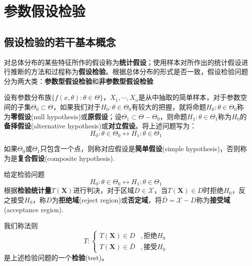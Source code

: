 \documentclass{ctexbook}
\begin{document}
\chapter{参数假设检验}

\section{假设检验的若干基本概念}

\begin{definition}[统计假设和假设检验]
    对总体分布的某些特征所作的假设称为\textbf{统计假设}；使用样本对所作出的统计假设进行推断的方法和过程称为\textbf{假设检验}。根据总体分布的形式是否一致，假设检验问题分为两大类：\textbf{参数型假设检验}和\textbf{非参数型假设检验}
\end{definition}

\begin{definition}[原假设与备择假设]
    设有参数分布族$\{f(x,\theta):\theta\in\Theta\}$，$X_1,\cdots,X_n$是从中抽取的简单样本，对于参数空间的子集$\Theta_0\subset\Theta$，如果我们对于$H_0:\theta\in\Theta_0$有较大的把握，就将命题$H_0:\theta\in\Theta_0$称为\textbf{零假设}(null hypothesis)或\textbf{原假设}；设$\Theta_1\subset\Theta-\Theta_0$，则命题$H_1:\theta\in\Theta_1$称为$H_0$的\textbf{备择假设}(alternative hypothesis)或\textbf{对立假设}。将上述问题写为：
    $$H_0:\theta\in\Theta_0\leftrightarrow H_1:\theta\in\Theta_1$$

    如果$\Theta_0$或$\Theta_1$只包含一个点，则称对应假设是\textbf{简单假设}(simple hypothesis)，否则称为是\textbf{复合假设}(composite hypothesis).
\end{definition}

\begin{definition}
    给定检验问题
    $$H_0:\theta\in\Theta_0\leftrightarrow H_1:\theta\in\Theta_1$$
    根据\textbf{检验统计量}$T(\mathbf{X})$进行判决，对于区域$D\in\mathcal{X}$，当$T(\mathbf{X})\in D$时拒绝$H_0$，反之接受$H_0$，称$D$为\textbf{拒绝域}(reject region)或\textbf{否定域}，将$\bar{D}=\mathcal{X}-D$称为\textbf{接受域}(acceptance region).

    我们称法则
    $$T:\begin{cases}
        T(\mathbf{X})\in D&,\text{拒绝}H_0\\
        T(\mathbf{X})\in\bar{D}&,\text{接受}H_0
    \end{cases}$$
    是上述检验问题的一个\textbf{检验}(test)。
\end{definition}
\end{document}
